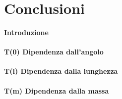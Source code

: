 \documentclass{article}
\begin{document}
	\section{Conclusioni}
	\paragraph{Introduzione}
	\paragraph{T(0) Dipendenza dall'angolo}
	\paragraph{T(l) Dipendenza dalla lunghezza}	
	\paragraph{T(m) Dipendenza dalla massa}
	
	
	
\end{document}
